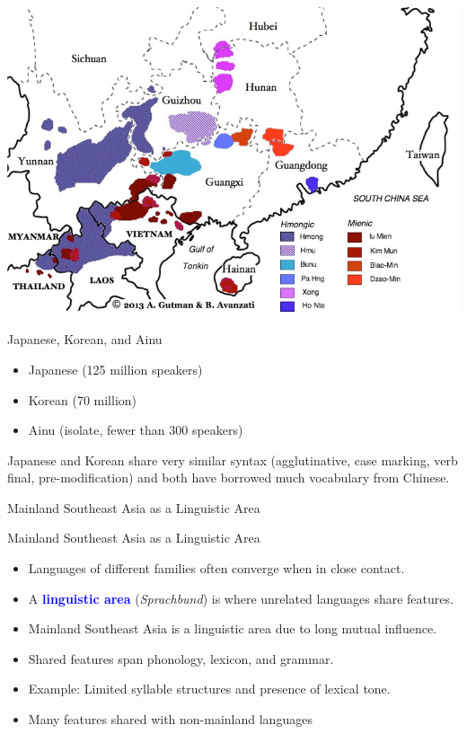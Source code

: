 \documentclass{beamer}
\newcommand{\txx}[1]{\textcolor{blue}{\textbf{#1}}}
\begin{document}
\begin{frame}
  \begin{center}
    \includegraphics[height=0.9\textheight]{pics/image8.png}
  \end{center}
\end{frame}

\begin{frame}{Japanese, Korean, and Ainu}
  \begin{itemize}
  \item Japanese (125 million speakers)
  \item Korean (70 million)
  \item Ainu (isolate, fewer than 300 speakers) 
  \end{itemize}

Japanese and Korean share very similar syntax (agglutinative, case marking, verb final, pre-modification) and both have borrowed much vocabulary from Chinese.
  
\end{frame}
\begin{frame}
  \begin{center}
    \huge Mainland Southeast Asia as a Linguistic Area
  \end{center}
\end{frame}

\begin{frame}{Mainland Southeast Asia as a Linguistic Area}
    \begin{itemize}
        \item Languages of different families often converge when in close contact.
        \item A \txx{linguistic area} (\textit{Sprachbund}) is where unrelated languages share features.
        \item Mainland Southeast Asia is a linguistic area due to long mutual influence.
        \item Shared features span phonology, lexicon, and grammar.
        \item Example: Limited syllable structures and presence of lexical tone.
        \item Many features shared with non-mainland languages
    \end{itemize}
\end{frame}
\end{document}
